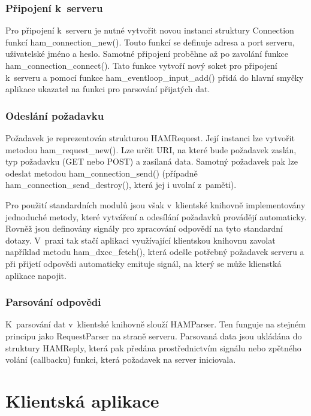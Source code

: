 \subsubsection{Připojení k~serveru}

Pro připojení k~serveru je nutné vytvořit novou instanci struktury Connection funkcí ham\_connection\_new(). Touto funkcí
se definuje adresa a port serveru, uživatelské jméno a heslo. Samotné připojení proběhne až po zavolání funkce
ham\_connection\_connect(). Tato funkce vytvoří nový soket pro připojení k~serveru a pomocí funkce ham\_eventloop\_input\_add()
přidá do hlavní smyčky aplikace ukazatel na funkci pro parsování přijatých dat.

\subsubsection{Odeslání požadavku}

Požadavek je reprezentován strukturou HAMRequest. Její instanci lze vytvořit metodou ham\_request\_new(). Lze určit
URI, na které bude požadavek zaslán, typ požadavku (GET nebo POST) a zasílaná data. Samotný požadavek pak lze odeslat
metodou ham\_connection\_send() (případně ham\_connection\_send\_destroy(), která jej i uvolní z~paměti).

Pro použití standardních modulů jsou však v~klientské knihovně implementovány jednoduché metody, které vytváření a odesílání
požadavků provádějí automaticky. Rovněž jsou definovány signály pro zpracování odpovědí na tyto standardní dotazy.
V~praxi tak stačí aplikaci využívající klientskou knihovnu zavolat například metodu ham\_dxcc\_fetch(), která odešle
potřebný požadavek serveru a při přijetí odpovědi automaticky emituje signál, na který se může klienstká aplikace napojit.

\subsubsection{Parsování odpovědi}

K~parsování dat v~klientské knihovně slouží HAMParser. Ten funguje na stejném principu jako RequestParser na straně serveru.
Parsovaná data jsou ukládána do struktury HAMReply, která pak předána prostřednictvím signálu nebo zpětného volání (callbacku)
funkci, která požadavek na server iniciovala.

\section{Klientská aplikace}
\label{implementace_klient}

